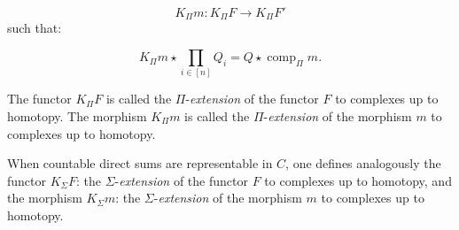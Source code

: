 \begin{equation}
  K_{\Pi}m\colon K_{\Pi}F\longrightarrow K_{\Pi}F'
  \tag{2.5.10.3}
\end{equation}
such that:

\begin{equation}
  K_{\Pi}m\star\prod_{i\in[n]}Q_i
  =Q\star\operatorname{comp}_{\Pi}m.
  \tag{2.5.10.4}
\end{equation}

The functor $K_{\Pi}F$ is called the $\Pi$-\emph{extension} of the functor
$F$ to complexes up to homotopy. The morphism $K_{\Pi}m$ is called the
$\Pi$-\emph{extension} of the morphism $m$ to complexes up to homotopy.

When countable direct sums are representable in $C$, one defines analogously
the functor $K_{\Sigma}F$: the $\Sigma$-\emph{extension} of the functor $F$
to complexes up to homotopy, and the morphism $K_{\Sigma}m$: the
$\Sigma$-\emph{extension} of the morphism $m$ to complexes up to homotopy.
